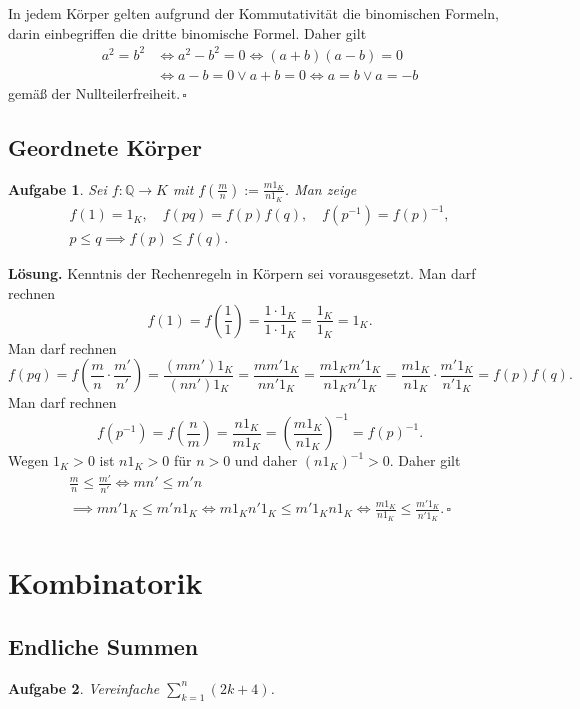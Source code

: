 \documentclass[a4paper,10pt,fleqn,twoside]{scrartcl}
\numberwithin{equation}{section}
\newcommand{\Q}{\mathbb Q}
\newcommand{\strong}[1]{{\normalfont\sffamily\bfseries #1}}
\renewcommand{\qedsymbol}{\ensuremath{\square}}
\theoremstyle{Aufgabe}
\newtheorem{Aufgabe}{\sffamily Aufgabe}[section]
\begin{document}
\noindent\strong{Lösung.}
In jedem Körper gelten aufgrund der Kommutativität die binomischen
Formeln, darin einbegriffen die dritte binomische Formel. Daher gilt
\begin{align*}
a^2 = b^2&\iff a^2 - b^2 = 0\iff (a+b)(a-b)=0\\
&\iff a-b=0\lor a+b=0\iff a=b\lor a=-b
\end{align*}
gemäß der Nullteilerfreiheit.\,\qedsymbol

\subsection{Geordnete Körper}

\begin{Aufgabe}
Sei $f\colon\Q\to K$ mit $f(\tfrac{m}{n}) := \tfrac{m1_K}{n1_K}$.
Man zeige
\begin{gather*}
f(1) = 1_K,\quad f(pq) = f(p)f(q),\quad f(p^{-1}) = f(p)^{-1},\\
p\le q\implies f(p)\le f(q).
\end{gather*}
\end{Aufgabe}
\strong{Lösung.} Kenntnis der Rechenregeln in Körpern sei vorausgesetzt.
Man darf rechnen
\[f(1) = f\left(\frac{1}{1}\right) = \frac{1\cdot 1_K}{1\cdot 1_K} = \frac{1_K}{1_K} = 1_K.\]
Man darf rechnen
\[f(pq) = f\left(\frac{m}{n}\cdot\frac{m'}{n'}\right)
= \frac{(mm')1_K}{(nn')1_K} = \frac{mm'1_K}{nn'1_K}
= \frac{m1_Km'1_K}{n1_Kn'1_K} = \frac{m1_K}{n1_K}\cdot\frac{m'1_K}{n'1_K} = f(p)f(q).\]
Man darf rechnen
\[f(p^{-1}) = f\left(\frac{n}{m}\right) = \frac{n1_K}{m1_K} = \left(\frac{m1_K}{n1_K}\right)^{-1} = f(p)^{-1}.\]
Wegen $1_K>0$ ist $n1_K>0$ für $n>0$ und daher $(n1_K)^{-1}>0$.
Daher gilt
\begin{gather*}
\frac{m}{n} \le \frac{m'}{n'} \iff mn' \le m'n\\
\implies mn'1_K \le m'n1_K \iff m1_Kn'1_K\le m'1_Kn1_K
\iff \frac{m1_K}{n1_K}\le\frac{m'1_K}{n'1_K}.\,\qedsymbol
\end{gather*}

\newpage
\section{Kombinatorik}
\subsection{Endliche Summen}
\begin{Aufgabe}
Vereinfache $\displaystyle\sum_{k=1}^n (2k+4)$.
\end{Aufgabe}
\end{document}
